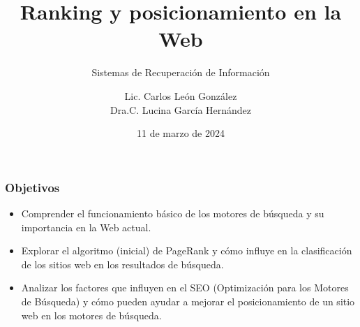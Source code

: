 \documentclass[
10pt, %
aspectratio=169, %
]{beamer}
\title[Short Title]{Ranking y posicionamiento en la Web}
\subtitle{Sistemas de Recuperación de Información}
\author{Lic. Carlos León González \\ Dra.C. Lucina García Hernández}
\institute[UC]{Facultad de Matem\'atica y Computaci\'on \\ Universidad de La Habana \\ \smallskip }
\date{11 de marzo de  2024} %
\begin{document}
	
	
	
	\begin{frame}
		\titlepage
	\end{frame}
	
	\begin{frame}
		
		\frametitle{Objetivos}
		
		\begin{itemize}

			\item Comprender el funcionamiento básico de los motores de búsqueda y su importancia en la Web actual. \\[2mm]
			
			\item Explorar el algoritmo (inicial) de PageRank y cómo influye en la clasificación de los sitios web en los resultados de búsqueda. \\[2mm]
			
			\item Analizar los factores que influyen en el SEO (Optimización para los Motores de Búsqueda) y cómo pueden ayudar a mejorar el posicionamiento de un sitio web en los motores de búsqueda.
			
		\end{itemize}
		
	\end{frame}
	
\end{document}
